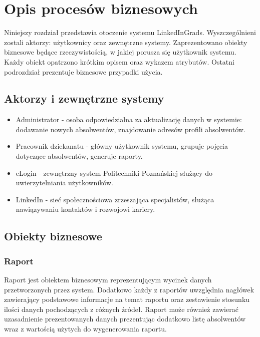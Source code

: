 \chapter{Opis procesów biznesowych}
\label{Chapter2}

Niniejszy rozdział przedstawia otoczenie systemu LinkedInGrads. Wyszczególnieni zostali aktorzy: użytkownicy oraz zewnętrzne systemy. Zaprezentowano obiekty biznesowe będące rzeczywistością, w jakiej porusza się użytkownik systemu. Każdy obiekt opatrzono krótkim opisem oraz wykazem atrybutów. Ostatni podrozdział prezentuje biznesowe przypadki użycia.

\section{Aktorzy i zewnętrzne systemy}
\label{Chapter21}

\begin{itemize}
\item Administrator - osoba odpowiedzialna za aktualizację danych w systemie: dodawanie nowych absolwentów, znajdowanie adresów profili absolwentów.
\item Pracownik dziekanatu - główny użytkownik systemu, grupuje pojęcia dotyczące absolwentów, generuje raporty.
\item eLogin - zewnętrzny system Politechniki Poznańskiej służący do uwierzytelniania użytkowników.
\item LinkedIn - sieć społecznościowa zrzeszająca specjalistów, służąca nawiązywaniu kontaktów i rozwojowi kariery.
\end{itemize}

\section{Obiekty biznesowe}
\label{Chapter22}

\subsection{Raport}

Raport jest obiektem biznesowym reprezentującym wycinek danych przetworzonych przez system. Dodatkowo każdy z raportów uwzględnia nagłówek zawierający podstawowe informacje na temat raportu oraz zestawienie stosunku ilości danych pochodzących z różnych źródeł. Raport może również zawierać uzasadnienie prezentowanych danych prezentując dodatkowo listę absolwentów wraz z wartością użytych do wygenerowania raportu.

